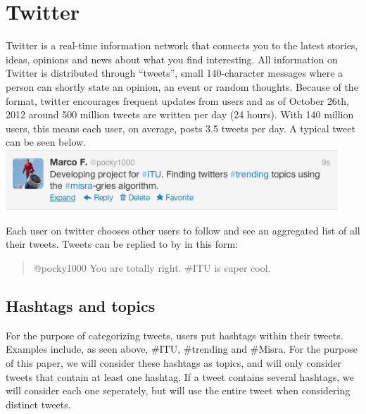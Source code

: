 \documentclass[12pt]{article}
\begin{document}
\section{Twitter}
Twitter is a real-time information network that connects you to the latest stories, ideas, opinions and news about what you find interesting. All information on Twitter is distributed through ``tweets'', small 140-character messages where a person can shortly state an opinion, an event or random thoughts. Because of the format, twitter encourages frequent updates from users and as of October 26th, 2012 around 500 million tweets are written per day (24 hours)\cite{Cnet1}. With 140 million users, this means each user, on average, posts 3.5 tweets per day. A typical tweet can be seen below.
\newline
\includegraphics[width=125mm]{tweet.png}
\newline

Each user on twitter chooses other users to follow and see an aggregated list of all their tweets. Tweets can be replied to by in this form:

\begin{quote}
    @pocky1000 You are totally right. \#ITU is super cool.
\end{quote}

\subsection{Hashtags and topics}
For the purpose of categorizing tweets, users put hashtags within their tweets. Examples include, as seen above, \#ITU, \#trending and \#Misra. For the purpose of this paper, we will consider these hashtags as topics, and will only consider tweets that contain at least one hashtag. If a tweet contains several hashtags, we will consider each one seperately, but will use the entire tweet when considering distinct tweets.
\end{document}
